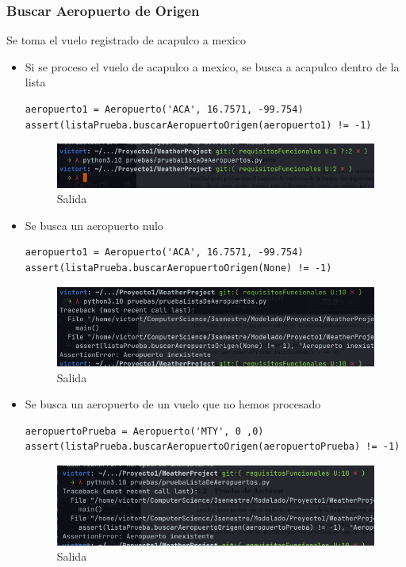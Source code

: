 \documentclass[12pt]{article}
\begin{document}
\subsubsection{Buscar Aeropuerto de Origen}
Se toma el vuelo registrado de acapulco a mexico
\begin{itemize}
\item Si se proceso el vuelo de acapulco a mexico, se busca a acapulco dentro de la lista
\begin{verbatim}
aeropuerto1 = Aeropuerto('ACA', 16.7571, -99.754)
assert(listaPrueba.buscarAeropuertoOrigen(aeropuerto1) != -1)    
\end{verbatim}
\begin{figure}[h!]
    \centering
    \includegraphics[scale=0.7]{pruebasPy/listaAeropuertos/bien.png}
    \caption{Salida}
\end{figure}

\item Se busca un aeropuerto nulo
\begin{verbatim}
aeropuerto1 = Aeropuerto('ACA', 16.7571, -99.754)
assert(listaPrueba.buscarAeropuertoOrigen(None) != -1)    
\end{verbatim}
\begin{figure}[h!]
    \centering
    \includegraphics[scale=0.4]{pruebasPy/listaAeropuertos/buscaNone.png}
    \caption{Salida}
  \end{figure}

\item Se busca un aeropuerto de un vuelo que no hemos procesado
\begin{verbatim}
aeropuertoPrueba = Aeropuerto('MTY', 0 ,0)
assert(listaPrueba.buscarAeropuertoOrigen(aeropuertoPrueba) != -1)    
\end{verbatim}
\begin{figure}[h!]
    \centering
    \includegraphics[scale=0.7]{pruebasPy/listaAeropuertos/buscaInex.png}
    \caption{Salida}
  \end{figure}
\end{itemize}
\end{document}
